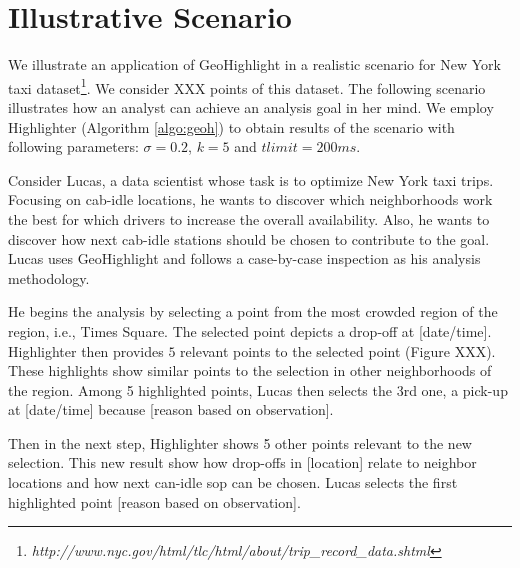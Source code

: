 \section{Illustrative Scenario}\label{sec:scenarios}
We illustrate an application of {\sc GeoHighlight} in a realistic scenario for New York taxi dataset\footnote{\it http://www.nyc.gov/html/tlc/html/about/trip_record_data.shtml}. We consider XXX points of this dataset. The following scenario illustrates how an analyst can achieve an analysis goal in her mind. We employ {\sc Highlighter} (Algorithm \ref{algo:geoh}) to obtain results of the scenario with following parameters: $\sigma = 0.2$, $k = 5$ and $tlimit = 200ms$. 

Consider Lucas, a data scientist whose task is to optimize New York taxi trips. Focusing on cab-idle locations, he wants to discover which neighborhoods work the best for which drivers to increase the overall availability. Also, he wants to discover how next cab-idle stations should be chosen to contribute to the goal. Lucas uses {\sc GeoHighlight} and follows a case-by-case inspection as his analysis methodology.

He begins the analysis by selecting a point from the most crowded region of the region, i.e., Times Square. The selected point depicts a drop-off at [date/time]. {\sc Highlighter} then provides $5$ relevant points to the selected point (Figure XXX). These highlights show similar points to the selection in other neighborhoods of the region. Among 5 highlighted points, Lucas then selects the 3rd one, a pick-up at [date/time] because [reason based on observation].

Then in the next step, {\sc Highlighter} shows 5 other points relevant to the new selection. This new result show how drop-offs in [location] relate to neighbor locations and how next can-idle sop can be chosen. Lucas selects the first highlighted point [reason based on observation].